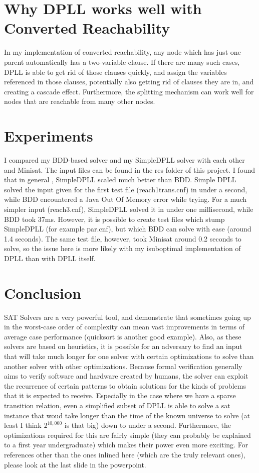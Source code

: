 \documentclass[11pt]{article}
\begin{document}
\begin{flushleft}
\section{Why DPLL works well with Converted Reachability} In my implementation of converted reachability, any node which has just one parent automatically has a two-variable clause. If there are many such cases, DPLL is able to get rid of those clauses quickly, and assign the variables referenced in those clauses, potentially also getting rid of clauses they are in, and creating a cascade effect. Furthermore, the splitting mechanism can work well for nodes that are reachable from many other nodes.

\section{Experiments}
I compared my BDD-based solver and my SimpleDPLL solver with each other and Minisat. The input files can be found in the res folder of this project. I found that in general , SimpleDPLL scaled much better than BDD. Simple DPLL solved the input given for the first test file (reach1trans.cnf) in under a second, while BDD encountered a Java Out Of Memory error while trying. For a much simpler input (reach3.cnf), SimpleDPLL solved it in under one millisecond, while BDD took 37ms.  However, it is possible to create test files which stump SimpleDPLL (for example par.cnf), but which BDD can solve with ease (around 1.4 seconds). The same test file, however, took Minisat around 0.2 seconds to solve, so the issue here is more likely with my isuboptimal implementation of DPLL than with DPLL itself.
\section{Conclusion} SAT Solvers are a very powerful tool, and demonstrate that sometimes going up in the worst-case order of complexity can mean vast improvements in terms of average case performance (quicksort is another good example). Also, as these solvers are based on heuristics, it is possible for an adversary to find an input that will take much longer for one solver with certain optimizations to solve than another solver with other optimizations. Because formal verification generally aims to verify software and hardware created by humans, the solver can exploit the recurrence of certain patterns to obtain solutions for the kinds of problems that it is expected to receive. Especially in the case where we have a sparse transition relation, even a simplified subset of DPLL is able to solve a sat instance that woud take longer than the time of the known universe to solve (at least I think $2^{10,000}$ is that big) down to under a second. Furthermore, the optimizations required for this are fairly simple (they can probably be explained to a first year undergraduate) which makes their power even more exciting. For references other than the ones inlined here (which are the truly relevant ones), please look at the last slide in the powerpoint.
\end{flushleft}
\end{document}
